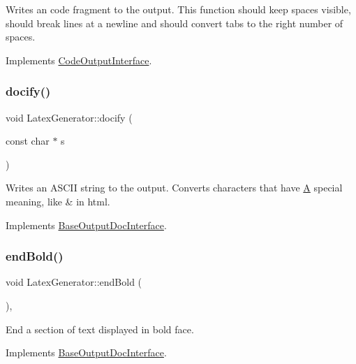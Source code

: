 Writes an code fragment to the output. This function should keep spaces visible, should break lines at a newline and should convert tabs to the right number of spaces. 

Implements \mbox{\hyperlink{class_code_output_interface_aa29a5eedda08596ace50ed5b59c8ae7f}{Code\+Output\+Interface}}.

\mbox{\label{class_latex_generator_ad6786a95e819d8af4dbfa717207cc674}} 
\subsubsection{\texorpdfstring{docify()}{docify()}}
{\footnotesize\ttfamily void Latex\+Generator\+::docify (\begin{DoxyParamCaption}\item[{const char $\ast$}]{s }\end{DoxyParamCaption})\hspace{0.3cm}{\ttfamily [virtual]}}

Writes an A\+S\+C\+II string to the output. Converts characters that have \mbox{\hyperlink{class_a}{A}} special meaning, like {\ttfamily \&} in html. 

Implements \mbox{\hyperlink{class_base_output_doc_interface_ad7d3f6631bd157739170690e669b3e75}{Base\+Output\+Doc\+Interface}}.

\mbox{\label{class_latex_generator_ae2336bd8bc8ca0802fb94ff6953e7779}} 
\subsubsection{\texorpdfstring{endBold()}{endBold()}}
{\footnotesize\ttfamily void Latex\+Generator\+::end\+Bold (\begin{DoxyParamCaption}{ }\end{DoxyParamCaption})\hspace{0.3cm}{\ttfamily [inline]}, {\ttfamily [virtual]}}

End a section of text displayed in bold face. 

Implements \mbox{\hyperlink{class_base_output_doc_interface_a2a17911ba778f8efac83999fb5d190d9}{Base\+Output\+Doc\+Interface}}.

